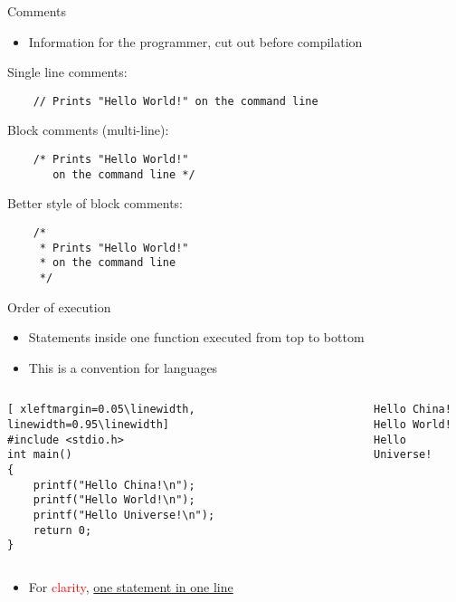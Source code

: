 \begin{frame}[fragile]{Comments}
	\begin{itemize}
		\item Information for the programmer, cut out before compilation
	\end{itemize}
	Single line comments:
	\begin{lstlisting}
	// Prints "Hello World!" on the command line
\end{lstlisting}
	Block comments (multi-line):
	\begin{lstlisting}
	/* Prints "Hello World!"
	   on the command line */
\end{lstlisting}
	Better style of block comments:
	\begin{lstlisting}
	/*
	 * Prints "Hello World!"
	 * on the command line
	 */
\end{lstlisting}
\end{frame}

\begin{frame}[fragile]{Order of execution}
	\begin{itemize}
		\item {Statements inside one function executed from top to bottom}
		\item {This is a convention for languages}
	\end{itemize}
\begin{columns}
\begin{column}{0.6\linewidth}
	\begin{lstlisting}[ xleftmargin=0.05\linewidth, linewidth=0.95\linewidth]
#include <stdio.h>
int main()
{
    printf("Hello China!\n");
    printf("Hello World!\n");
    printf("Hello Universe!\n");
    return 0;
}
\end{lstlisting}
\end{column}
\begin{column}{0.1\linewidth}
\end{column}
\begin{column}{0.3\linewidth}
	\begin{lstlisting}[frame=none, xleftmargin=0.01\linewidth]
Hello China!
Hello World!
Hello Universe!
	\end{lstlisting}
\end{column}
\end{columns}
\begin{itemize}
	\item {For \textcolor{red}{clarity}, \underline{one statement in one line}}
\end{itemize}

\end{frame}


